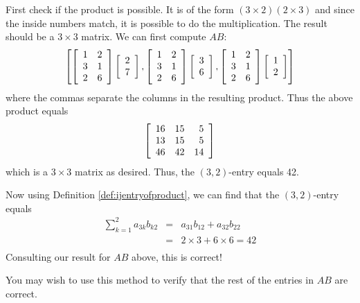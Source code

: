 \begin{solution} First check if the product is possible. It is of the form $\left( 3\times
2\right) \left( 2\times 3\right) $ and since the inside numbers match, it is possible to do the multiplication. The result should be a $3\times 3$ matrix. 
We can first compute $AB$:
\begin{equation*}
\left[ \left[
\begin{array}{rr}
1 & 2 \\
3 & 1 \\
2 & 6
\end{array}
\right] \left[
\begin{array}{r}
2 \\
7
\end{array}
\right] ,\left[
\begin{array}{rr}
1 & 2 \\
3 & 1 \\
2 & 6
\end{array}
\right] \left[
\begin{array}{r}
3 \\
6
\end{array}
\right] ,\left[
\begin{array}{rr}
1 & 2 \\
3 & 1 \\
2 & 6
\end{array}
\right] \left[
\begin{array}{r}
1 \\
2
\end{array}
\right] \right]
\end{equation*}
where the commas separate the columns in the resulting product. Thus the
above product equals
\begin{equation*}
 \left[
\begin{array}{rrr}
16 & 15 & 5 \\
13 & 15 & 5 \\
46 & 42 & 14
\end{array}
\right] 
\end{equation*}
which is a $3\times 3$ matrix as desired. Thus, the $\left( 3,2 \right)$-entry equals 42.

Now using Definition
\ref{def:ijentryofproduct}, we can find that the $\left( 3,2 \right)$-entry equals
\begin{eqnarray*}
\sum_{k=1}^{2}a_{3k}b_{k2} &=&a_{31}b_{12}+a_{32}b_{22} \\
&=&2\times 3+6\times 6=42\\
\end{eqnarray*}
Consulting our result for $AB$ above, this is correct! 

You may wish to use this method to verify that the rest of the entries in $AB$ are correct.
\end{solution}


